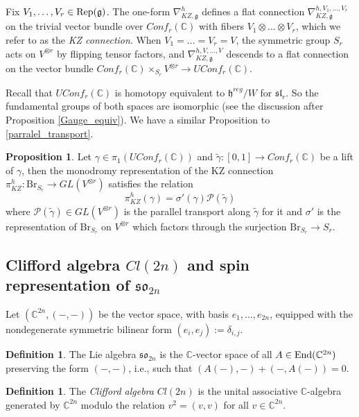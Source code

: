 \documentclass[10pt]{amsart}
\numberwithin{equation}{section}
\theoremstyle{definition}
\newtheorem{proposition}[theorem]{Proposition}
\newtheorem{definition}[theorem]{Definition}
\newcommand{\End}{{\rm End}}
\def\C{{\mathbb C}}
\newcommand{\son}[1][2n]{\mathfrak{so}_{#1}}
\newcommand{\ot}{\otimes}
\newcommand{\Br}{\mathrm{Br}}
\newcommand{\g}{\mathfrak{g}}
\begin{document}
Fix $V_1, \dots, V_r \in {\rm Rep}(\mathfrak{g})$. The one-form $\nabla_{KZ, \g}^{h}$ defines a flat connection $\nabla_{KZ, \g}^{h, V_1, \dots, V_r}$ on the trivial vector bundle over $Conf_r(\C)$ with fibers $V_1\otimes \dots \otimes V_r$, which we refer to as the \emph{KZ connection}. When $V_1=\dots = V_r= V$, the symmetric group $S_r$ acts on $V^{\otimes r}$ by flipping tensor factors, and $\nabla_{KZ, \g}^{h, V, \dots, V}$ descends to a flat connection on the vector bundle $Conf_r(\C)\times_{{S_r}}V^{\otimes r}\rightarrow UConf_r(\C)$.

Recall that $UConf_r(\C)$ is homotopy equivalent to $\mathfrak{h}^{reg}/W$ for $\mathfrak{sl}_r$. So the fundamental groups of both spaces are isomorphic (see the discussion after Proposition \ref{Gauge_equiv}). We have a similar Proposition to \ref{parralel_transport}.

\begin{proposition}\label{parralel_transport_KZ}
    Let $\gamma \in \pi_1(UConf_r(\C))$ and $\widetilde{\gamma}:[0,1]\rightarrow Conf_r(\C)$ be a lift of $\gamma$, then the monodromy representation of the KZ connection $\pi_{KZ}^h:\Br_{ S_r} \rightarrow GL(V^{\ot r})$ satisfies the relation
    \[
    \pi_{KZ}^h(\gamma)=\sigma'(\gamma)\mathcal{P}(\widetilde{\gamma})
    \]
    where $\mathcal{P}(\widetilde{\gamma})\in GL(V^{\ot r})$ is the parallel transport along $\widetilde{\gamma}$ for it and $\sigma'$ is the representation of $\Br_{ S_r}$ on $V^{\ot r}$ which factors through the surjection $\Br_{ S_r}\rightarrow  S_r$.
\end{proposition}

\subsection{Clifford algebra $Cl(2n)$ and spin representation of $\son$}\label{spinrepforson}

Let $(\C^{2n}, (-,-))$ be the vector space, with basis $e_1, \dots, e_{2n}$, equipped with the nondegenerate symmetric bilinear form $(e_i, e_j) := \delta_{i,j}$. 

\begin{definition}
The Lie algebra $\son[2n]$ is the $\C$-vector space of all $A\in \End(\C^{2n})$ preserving the form $(-,-)$, i.e., such that $(A(-),-) + (-,A(-))=0$.
\end{definition}

\begin{definition}
The \emph{Clifford algebra} $Cl(2n)$ is the unital associative $\C$-algebra generated by $\C^{2n}$ modulo the relation $v^2= (v,v)$ for all $v\in \C^{2n}$.
\end{definition} 
\end{document}
